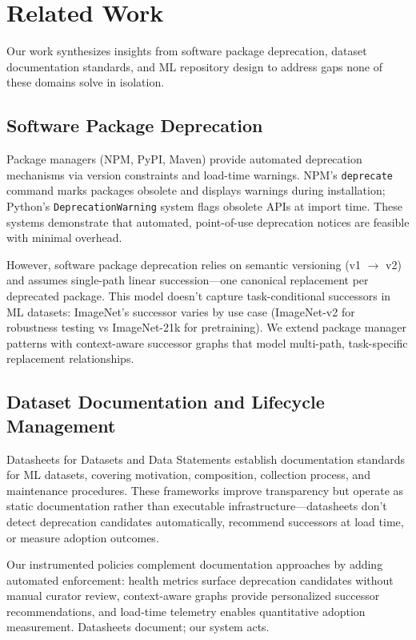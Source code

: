 \section{Related Work}

Our work synthesizes insights from software package deprecation, dataset documentation standards, and ML repository design to address gaps none of these domains solve in isolation.

\subsection{Software Package Deprecation}

Package managers (NPM, PyPI, Maven) provide automated deprecation mechanisms via version constraints and load-time warnings. NPM's \texttt{deprecate} command marks packages obsolete and displays warnings during installation; Python's \texttt{DeprecationWarning} system flags obsolete APIs at import time. These systems demonstrate that automated, point-of-use deprecation notices are feasible with minimal overhead.

However, software package deprecation relies on semantic versioning (v1 $\rightarrow$ v2) and assumes single-path linear succession---one canonical replacement per deprecated package. This model doesn't capture task-conditional successors in ML datasets: ImageNet's successor varies by use case (ImageNet-v2 for robustness testing vs ImageNet-21k for pretraining). We extend package manager patterns with context-aware successor graphs that model multi-path, task-specific replacement relationships.

\subsection{Dataset Documentation and Lifecycle Management}

Datasheets for Datasets \cite{gebru2018datasheets} and Data Statements \cite{bender2018data} establish documentation standards for ML datasets, covering motivation, composition, collection process, and maintenance procedures. These frameworks improve transparency but operate as static documentation rather than executable infrastructure---datasheets don't detect deprecation candidates automatically, recommend successors at load time, or measure adoption outcomes.

Our instrumented policies complement documentation approaches by adding automated enforcement: health metrics surface deprecation candidates without manual curator review, context-aware graphs provide personalized successor recommendations, and load-time telemetry enables quantitative adoption measurement. Datasheets document; our system acts.


